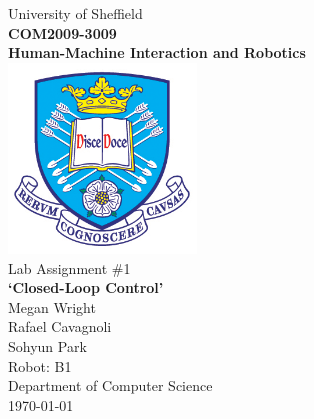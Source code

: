 \documentclass[hidelinks,a4paper,11pt]{article}
\begin{document}
\begin{titlepage}

\begin{center}
{\LARGE University of Sheffield}\\[1cm]
\huge {\bfseries COM2009-3009\\Human-Machine Interaction and Robotics}\\[1cm]
\includegraphics[width=5cm]{tuoslogo.png}\\[1cm]
{\LARGE Lab Assignment \#1\\\textbf{`Closed-Loop Control'}}\\[2cm]


{\Large Megan Wright}\\
{\Large Rafael Cavagnoli}\\
{\Large Sohyun Park}\\[1cm]

{\LARGE Robot: B1}\\[1cm]

{\LARGE Department of Computer Science}\\
{\Large \today}
\end{center}

\end{titlepage}

\tableofcontents
\newpage
\end{document}
